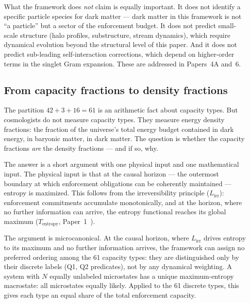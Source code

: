 \documentclass[11pt]{article}
\begin{document}
What the framework does \emph{not} claim is equally important.  It does not identify a specific particle species for dark matter --- dark matter in this framework is not ``a particle'' but a sector of the enforcement budget.  It does not predict small-scale structure (halo profiles, substructure, stream dynamics), which require dynamical evolution beyond the structural level of this paper.  And it does not predict sub-leading self-interaction corrections, which depend on higher-order terms in the singlet Gram expansion.  These are addressed in Papers~4A and~6.


\subsection{From capacity fractions to density fractions}

The partition $42 + 3 + 16 = 61$ is an arithmetic fact about capacity types.  But cosmologists do not measure capacity types.  They measure energy density fractions: the fraction of the universe's total energy budget contained in dark energy, in baryonic matter, in dark matter.  The question is whether the capacity fractions \emph{are} the density fractions --- and if so, why.

The answer is a short argument with one physical input and one mathematical input.  The physical input is that at the causal horizon --- the outermost boundary at which enforcement obligations can be coherently maintained --- entropy is maximized.  This follows from the irreversibility principle ($L_{\mathrm{irr}}$): enforcement commitments accumulate monotonically, and at the horizon, where no further information can arrive, the entropy functional reaches its global maximum ($T_{\mathrm{entropy}}$, Paper~1~\cite{BrookePaper1}).

The argument is microcanonical.  At the causal horizon, where $L_{\mathrm{irr}}$ drives entropy to its maximum and no further information arrives, the framework can assign no preferred ordering among the 61 capacity types: they are distinguished only by their discrete labels (Q1, Q2 predicates), not by any dynamical weighting.  A system with $N$ equally unlabeled microstates has a unique maximum-entropy macrostate: all microstates equally likely.  Applied to the 61 discrete types, this gives each type an equal share of the total enforcement capacity.
\end{document}
